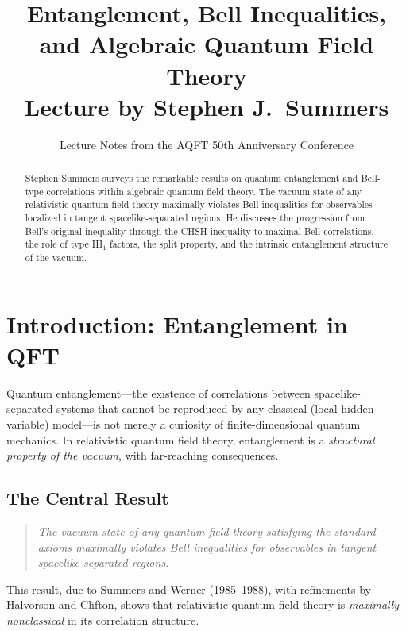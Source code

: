 \documentclass[11pt,a4paper]{article}
\title{\textbf{Entanglement, Bell Inequalities,\\and Algebraic Quantum Field Theory}\\[6pt]
\large Lecture by Stephen J.\ Summers}
\author{Lecture Notes from the AQFT 50th Anniversary Conference}
\date{}
\begin{document}
\maketitle

\begin{abstract}
Stephen Summers surveys the remarkable results on quantum entanglement and
Bell-type correlations within algebraic quantum field theory. The vacuum state
of any relativistic quantum field theory maximally violates Bell inequalities
for observables localized in tangent spacelike-separated regions. He discusses
the progression from Bell's original inequality through the CHSH inequality
to maximal Bell correlations, the role of type III$_1$ factors, the split
property, and the intrinsic entanglement structure of the vacuum.
\end{abstract}

\tableofcontents

\section{Introduction: Entanglement in QFT}

Quantum entanglement---the existence of correlations between spacelike-separated
systems that cannot be reproduced by any classical (local hidden variable)
model---is not merely a curiosity of finite-dimensional quantum mechanics.
In relativistic quantum field theory, entanglement is a \emph{structural
property of the vacuum}, with far-reaching consequences.

\subsection{The Central Result}

\begin{quote}
\emph{The vacuum state of any quantum field theory satisfying the standard
axioms maximally violates Bell inequalities for observables in tangent
spacelike-separated regions.}
\end{quote}

This result, due to Summers and Werner (1985--1988), with refinements by
Halvorson and Clifton, shows that relativistic quantum field theory is
\emph{maximally nonclassical} in its correlation structure.

\end{document}
